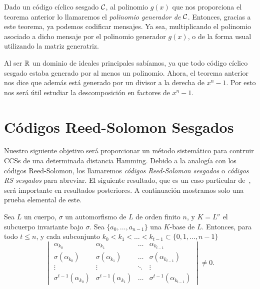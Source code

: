 Dado un código cíclico sesgado \(\mathcal{C}\), al polinomio \(g(x)\) que nos proporciona el teorema anterior lo llamaremos el \textit{polinomio generador de} \(\mathcal{C}\). Entonces, gracias a este teorema, ya podemos codificar mensajes. Ya sea, multiplicando el polinomio asociado a dicho mensaje por el polinomio generador \(g(x)\), o de la forma usual utilizando la matriz generatriz.

Al ser \(\mathbb{R}\) un dominio de ideales principales sabíamos, ya que todo código cíclico sesgado estaba generado por al menos un polinomio. Ahora, el teorema anterior nos dice que además está generado por un divisor a la derecha de \(x^{n} -1 \). Por esto nos será útil estudiar la descomposición en factores de \(x^{n} - 1\).
\section{Códigos Reed-Solomon Sesgados}%
\label{sec:códigos_reed_solomon_sesgados}

Nuestro siguiente objetivo será proporcionar un método sistemático para contruir CCSs de una determinada distancia Hamming. Debido a la analogía con los códigos Reed-Solomon, los llamaremos \textit{códigos Reed-Solomon sesgados} o \textit{códigos RS sesgados} para abreviar. El siguiente resultado, que es un caso particular de~\cite[Corolario 4.13]{Lam_1988}, será importante en resultados posteriores. A continuación mostramos solo una prueba elemental de este.

\begin{lemma}
\label{lem:det_0}
    Sea \(L\) un cuerpo, \(\sigma\) un automorfismo de \(L\) de orden finito \(n\), y \(K = L^\sigma\) el subcuerpo invariante bajo \(\sigma\). Sea  \(\{a_0, \dots, a_{n-1}\}\) una \(K\)-base de \(L\). Entonces, para todo \(t \leq n\), y cada subconjunto \(k_0 < k_1 < \dots < k_{t-1} \subset \{0, 1, \dots, n-1\}\)
    \[
    \begin{vmatrix}
        \alpha_{k_0} & \alpha_{k_1} & \dots & \alpha_{k_{t -1}} \\
        \sigma(\alpha_{k_0}) & \sigma(\alpha_{k_1}) & \dots & \sigma(\alpha_{k_{t-1}}) \\
        \vdots & \vdots & \ddots & \vdots \\
        \sigma^{t-1}(\alpha_{k_0}) & \sigma^{t-1}(\alpha_{k_1}) & \dots & \sigma^{t-1}(\alpha_{k_{t-1}})
    \end{vmatrix}
    \neq 0
    .\]
\end{lemma}

